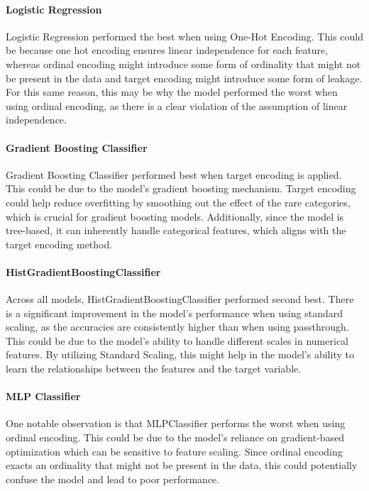 \documentclass{article}
\begin{document}
\paragraph{Logistic Regression}
Logistic Regression performed the best when using One-Hot Encoding. This could be because one hot encoding ensures linear independence for each feature, whereas ordinal encoding might introduce some form of ordinality that might not be present in the data and target encoding might introduce some form of leakage. For this same reason, this may be why the model performed the worst when using ordinal encoding, as there is a clear violation of the assumption of linear independence.

\paragraph{Gradient Boosting Classifier}
Gradient Boosting Classifier performed best when target encoding is applied. This could be due to the model's gradient boosting mechanism. Target encoding could help reduce overfitting by smoothing out the effect of the rare categories, which is crucial for gradient boosting models. Additionally, since the model is tree-based, it can inherently handle categorical features, which aligns with the target encoding method.

\paragraph{HistGradientBoostingClassifier}
Across all models, HistGradientBoostingClassifier performed second best. There is a significant improvement in the model's performance when using standard scaling, as the accuracies are consistently higher than when using passthrough. This could be due to the model's ability to handle different scales in numerical features. By utilizing Standard Scaling, this might help in the model's ability to learn the relationships between the features and the target variable.

\paragraph{MLP Classifier}
One notable observation is that MLPClassifier performs the worst when using ordinal encoding. This could be due to the model's reliance on gradient-based optimization which can be sensitive to feature scaling. Since ordinal encoding exacts an ordinality that might not be present in the data, this could potentially confuse the model and lead to poor performance.
\end{document}
